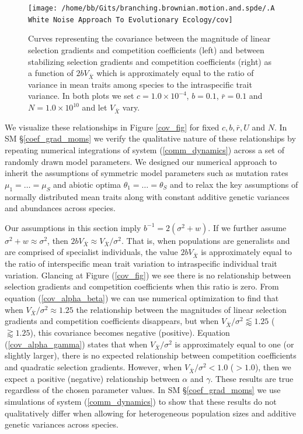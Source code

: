 \documentclass[]{article}
\begin{document}
\begin{figure}

{\centering \texttt{[image: /home/bb/Gits/branching.brownian.motion.and.spde/.A White Noise Approach To Evolutionary Ecology/cov]} 

}

\caption{\label{cov_fig}Curves representing the covariance between the magnitude of linear selection gradients and competition coefficients (left) and between stabilizing selection gradients and competition coefficients (right) as a function of $2bV_{\bar X}$ which is approximately equal to the ratio of variance in mean traits among species to the intraspecific trait variance. In both plots we set $c=1.0\times10^{-4}$, $b=0.1$, $\bar r=0.1$ and $N=1.0\times10^{10}$ and let $V_{\bar X}$ vary.}\label{fig:unnamed-chunk-10}
\end{figure}

We visualize these relationships in Figure \ref{cov_fig} for fixed
\(c,b,\bar r,U\) and \(N\). In SM \S\ref{coef_grad_moms} we verify the
qualitative nature of these relationships by repeating numerical
integrations of system (\ref{comm_dynamics}) across a set of randomly
drawn model parameters. We designed our numerical approach to inherit
the assumptions of symmetric model parameters such as mutation rates
\(\mu_1=\dots=\mu_S\) and abiotic optima \(\theta_1=\dots=\theta_S\) and
to relax the key assumptions of normally distributed mean traits along
with constant additive genetic variances and abundances across species.

Our assumptions in this section imply \(b^{-1}=2(\sigma^2+w)\). If we
further assume \(\sigma^2+w\approx\sigma^2\), then
\(2bV_{\bar X}\approx V_{\bar X}/\sigma^2\). That is, when populations
are generalists and are comprised of specialist individuals, the value
\(2bV_{\bar X}\) is approximately equal to the ratio of interspecific
mean trait variation to intraspecific individual trait variation.
Glancing at Figure (\ref{cov_fig}) we see there is no relationship
between selection gradients and competition coefficients when this ratio
is zero. From equation (\ref{cov_alpha_beta}) we can use numerical
optimization to find that when \(V_{\bar X}/\sigma^2\approx1.25\) the
relationship between the magnitudes of linear selection gradients and
competition coefficients disappears, but when
\(V_{\bar X}/\sigma^2\lessapprox1.25\) (\(\gtrapprox1.25\)), this
covariance becomes negative (positive). Equation (\ref{cov_alpha_gamma})
states that when \(V_{\bar X}/\sigma^2\) is approximately equal to one
(or slightly larger), there is no expected relationship between
competition coefficients and quadratic selection gradients. However,
when \(V_{\bar X}/\sigma^2<1.0\) (\(>1.0\)), then we expect a positive
(negative) relationship between \(\alpha\) and \(\gamma\). These results
are true regardless of the chosen parameter values. In SM
\S\ref{coef_grad_moms} we use simulations of system
(\ref{comm_dynamics}) to show that these results do not qualitatively
differ when allowing for heterogeneous population sizes and additive
genetic variances across species.
\end{document}
